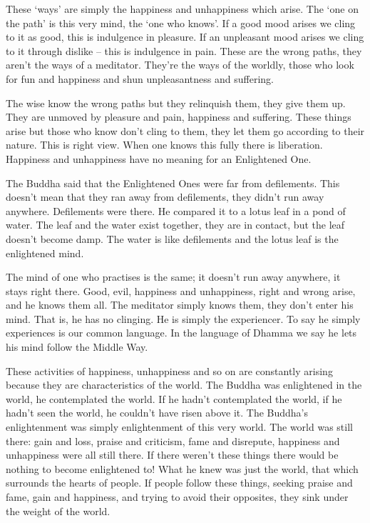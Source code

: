 These `ways' are simply the happiness and unhappiness which arise. The `one on the path' is this very mind, the `one who knows'. If a good mood arises we cling to it as good, this is indulgence in pleasure. If an unpleasant mood arises we cling to it through dislike -- this is indulgence in pain. These are the wrong paths, they aren't the ways of a meditator. They're the ways of the worldly, those who look for fun and happiness and shun unpleasantness and suffering. 

The wise know the wrong paths but they relinquish them, they give them up. They are unmoved by pleasure and pain, happiness and suffering. These things arise but those who know don't cling to them, they let them go according to their nature. This is right view. When one knows this fully there is liberation. Happiness and unhappiness have no meaning for an Enlightened One. 

The Buddha said that the Enlightened Ones were far from defilements. This doesn't mean that they ran away from defilements, they didn't run away anywhere. Defilements were there. He compared it to a lotus leaf in a pond of water. The leaf and the water exist together, they are in contact, but the leaf doesn't become damp. The water is like defilements and the lotus leaf is the enlightened mind. 

The mind of one who practises is the same; it doesn't run away anywhere, it stays right there. Good, evil, happiness and unhappiness, right and wrong arise, and he knows them all. The meditator simply knows them, they don't enter his mind. That is, he has no clinging. He is simply the experiencer. To say he simply experiences is our common language. In the language of Dhamma we say he lets his mind follow the Middle Way. 

These activities of happiness, unhappiness and so on are constantly arising because they are characteristics of the world. The Buddha was enlightened in the world, he contemplated the world. If he hadn't contemplated the world, if he hadn't seen the world, he couldn't have risen above it. The Buddha's enlightenment was simply enlightenment of this very world. The world was still there: gain and loss, praise and criticism, fame and disrepute, happiness and unhappiness were all still there. If there weren't these things there would be nothing to become enlightened to! What he knew was just the world, that which surrounds the hearts of people. If people follow these things, seeking praise and fame, gain and happiness, and trying to avoid their opposites, they sink under the weight of the world. 

